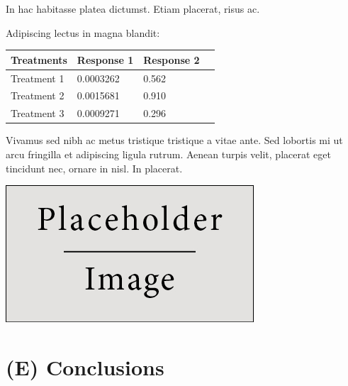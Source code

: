 \documentclass[a0,landscape]{a0poster}
\begin{document}
\begin{multicols*}{3}
In hac habitasse platea dictumst. Etiam placerat, risus ac.

Adipiscing lectus in magna blandit:

\begin{center}\vspace{1cm}
\begin{tabular}{l l l l}
\toprule
\textbf{Treatments} & \textbf{Response 1} & \textbf{Response 2} \\
\midrule
Treatment 1 & 0.0003262 & 0.562 \\
Treatment 2 & 0.0015681 & 0.910 \\
Treatment 3 & 0.0009271 & 0.296 \\
\bottomrule
\end{tabular}
\end{center}\vspace{1cm}

Vivamus sed nibh ac metus tristique tristique a vitae ante. Sed lobortis mi ut arcu fringilla et adipiscing ligula rutrum. Aenean turpis velit, placerat eget tincidunt nec, ornare in nisl. In placerat.

\begin{center}\vspace{1cm}
\includegraphics[width=0.8\linewidth]{placeholder}
\end{center}\vspace{1cm}


\color{SaddleBrown} %

\section*{(E) Conclusions}


\end{multicols*}
\end{document}
